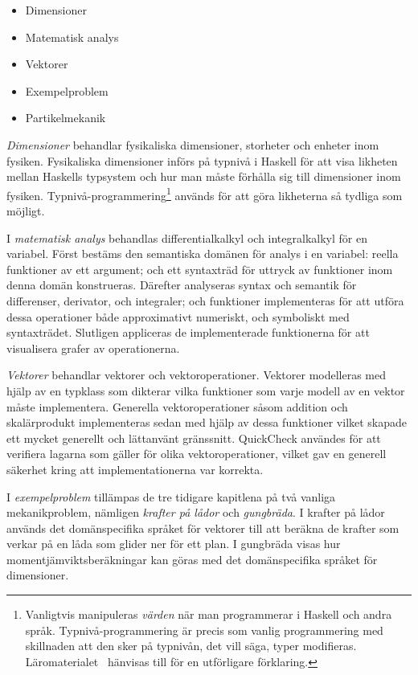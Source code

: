 \begin{itemize}
  \item Dimensioner
  \item Matematisk analys
  \item Vektorer
  \item Exempelproblem
  \item Partikelmekanik
\end{itemize}

\textit{Dimensioner} behandlar fysikaliska dimensioner, storheter och enheter inom fysiken.
Fysikaliska dimensioner införs på typnivå i Haskell för att visa likheten mellan
Haskells typsystem och hur man måste förhålla sig till dimensioner inom fysiken.
Typnivå-programmering\footnote{Vanligtvis manipuleras \textit{värden} när man
programmerar i Haskell och andra språk. Typnivå-programmering är precis som
vanlig programmering med skillnaden att den sker på typnivån, det vill säga,
typer modifieras. Läromaterialet~\cite{LYAP} hänvisas till för en utförligare
förklaring.} används för att göra likheterna så tydliga som möjligt.

I \textit{matematisk analys} behandlas differentialkalkyl och
integralkalkyl för en variabel. Först bestäms den semantiska domänen
för analys i en variabel: reella funktioner av ett argument; och ett syntaxträd
för uttryck av funktioner inom denna domän konstrueras. Därefter
analyseras syntax och semantik för differenser, derivator, och
integraler; och funktioner implementeras för att utföra dessa
operationer både approximativt numeriskt, och symboliskt med
syntaxträdet. Slutligen appliceras de implementerade funktionerna för
att visualisera grafer av operationerna.

\textit{Vektorer} behandlar vektorer och vektoroperationer. Vektorer modelleras
med hjälp av en typklass som dikterar vilka funktioner som varje
modell av en vektor måste implementera. Generella vektoroperationer såsom
addition och skalärprodukt implementeras sedan med hjälp av dessa funktioner
vilket skapade ett mycket generellt och lättanvänt gränssnitt. QuickCheck
användes för att verifiera lagarna som gäller för olika vektoroperationer,
vilket gav en generell säkerhet kring att implementationerna var korrekta.

I \textit{exempelproblem} tillämpas de tre tidigare kapitlena på två vanliga mekanikproblem, nämligen \textit{krafter på lådor} och \textit{gungbräda}. I krafter på lådor används det domänspecifika språket för vektorer till att beräkna de krafter som verkar på en låda som glider ner för ett plan. I gungbräda visas hur momentjämviktsberäkningar kan göras med det domänspecifika språket för dimensioner.

